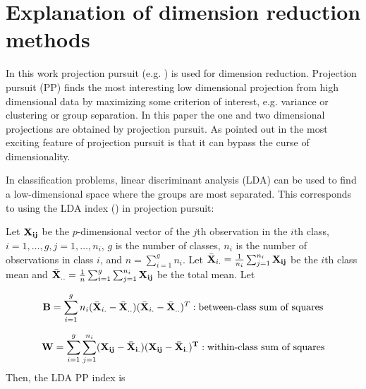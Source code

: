

 
\section{Explanation of dimension reduction methods}  \label{sec:dimred}


In this work projection pursuit (e.g. \cite{friedman:1974}) is used for dimension reduction. Projection pursuit (PP) finds the most interesting low dimensional projection from high dimensional data by maximizing some criterion of interest, e.g. variance or clustering or group separation. In this paper the one and two dimensional projections are obtained by projection pursuit.  As pointed out in \cite{huber:1985} the most exciting feature of projection pursuit is that it can bypass the curse of dimensionality. 

In classification problems, linear discriminant analysis (LDA) can be used to find a low-dimensional space where the groups are most separated. This corresponds to using the LDA index (\cite{lee:2009}) in projection pursuit:

Let $\bf{X_{ij}}$ be the $p$-dimensional vector of the $j$th observation in the $i$th class, $i = 1, \dots, g, j = 1, \dots, n_i$, $g$ is the number of classes, $n_i$ is the number of observations in class $i$, and $n = \sum_{i = 1}^g n_i$. Let $\bar{\bf{X}}_{i.} = \frac{1}{n_i} \sum_{j = 1}^{n_i} \bf{X}_{ij}$ be the $i$th class mean and $\bar{\bf{X}}_{..} = \frac{1}{n} \sum_{i = 1}^g \sum_{j = 1}^{n_i} \bf{X}_{ij}$ be the total mean. Let

$$\hbox{\bf{B}} = \sum_{i=1}^g n_i (\bar{\bf{X}}_{i.} - \bar{\bf{X}}_{..})(\bar{\bf{X}}_{i.} - \bar{\bf{X}}_{..})^T : \hbox{between-class sum of squares}$$

$$\hbox{\textbf{W}} = \sum_{i=1}^g \sum_{j=1}^{n_i} (\bf{X_{ij}} - \bar{\bf{X}}_{i.})(\bf{X_{ij}} - \bar{\bf{X}}_{i.})^T : \hbox{within-class sum of squares}$$
Then, the LDA PP index is 

